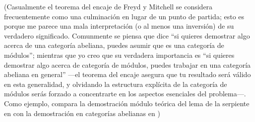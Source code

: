 (Casualmente el teorema del encaje de Freyd y Mitchell se considera
frecuentemente como una culminación en lugar de un punto de partida; esto es
porque me parece una mala interpretación (o al menos una inversión) de su
verdadero significado. Comunmente se piensa que dice \enquote{si quieres
demostrar algo acerca de una categoría abeliana, puedes asumir que es una
categoría de módulos}; mientras que yo creo que su verdadera importancia es
\enquote{si quieres demostrar algo acerca de categoría de módulos, puedes
trabajar en una categoría abeliana en general} ---el teorema del encaje asegura
que tu resultado será válido en esta generalidad, y olvidando la estructura
explícita de la categoría de módulos serás forzado a concentrarte en los
aspectos esenciales del problema---. Como ejemplo, compara la demostración
módulo teórica del lema de la serpiente en  con la demostración en
categorías abelianas en )